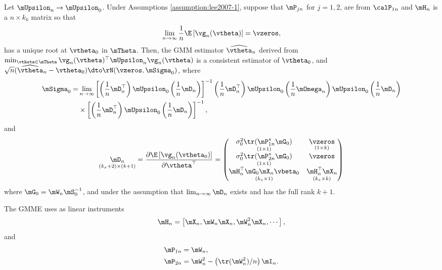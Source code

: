 \documentclass[english,12pt]{book}\usepackage[]{graphicx}\usepackage[]{xcolor}
\begin{document}
\begin{theorem}\label{teo:GMME-SLM}
Let $\mUpsilon_n\to \mUpsilon_0$. Under Assumptions \ref{assumption:lee2007-1}, suppose that $\mP_{jn}$ for $j = 1, 2$, are from $\calP_{1n}$ and $\mH_n$ is a $n\times k_k$ matrix so that
\begin{equation*}
\lim_{n \to \infty}\frac{1}{n}\E\left[\vg_n(\vtheta)\right] = \vzeros, 
\end{equation*}
%
has a unique root at $\vtheta_0$ in $\mTheta$. Then, the GMM estimator $\widehat{\vtheta}_n$ derived from $\min_{\vtheta \in \mTheta}\vg_n(\vtheta)^\top\mUpsilon_n\vg_n(\vtheta)$ is a consistent estimator of $\vtheta_0$, and $\sqrt{n}(\widehat{\vtheta}_n - \vtheta_0)\dto \rN(\vzeros, \mSigma_0)$, where
\begin{equation*}
\begin{aligned}
  \mSigma_0 = &  \lim_{n\to\infty}\left[\left(\frac{1}{n}\mD_n^\top\right)\mUpsilon_0\left(\frac{1}{n}\mD_n\right)\right]^{-1}\left(\frac{1}{n}\mD_n^\top\right)\mUpsilon_0\left(\frac{1}{n}\mOmega_n\right)\mUpsilon_0\left(\frac{1}{n}\mD_n\right) \\
  & \times \left[\left(\frac{1}{n}\mD_n^\top\right)\mUpsilon_0\left(\frac{1}{n}\mD_n\right)\right]^{-1},
  \end{aligned}
\end{equation*}
%
and
\begin{equation}\label{eq:D-gmm-slm}
\underset{(k_x + 2)\times (k + 1)}{\mD_n} = \frac{\partial \E\left[\vg_n(\vtheta_0)\right]}{\partial \vtheta^\top} = \begin{pmatrix}
           \underset{(1 \times 1)}{\sigma_0^2\tr(\mP^s_{1n}\mG_0)} & \underset{(1 \times k)}{\vzeros} \\
           \underset{(1 \times 1)}{\sigma_0^2\tr(\mP^s_{2n}\mG_0)} & \vzeros \\
           \underset{(k_x \times 1)}{\mH_n^\top\mG_0\mX_n\vbeta_0} & \underset{(k_x\times k)}{\mH^\top_n\mX_n}
         \end{pmatrix}
\end{equation}
%
where $\mG_0 = \mW_n\mS_0^{-1}$, and under the assumption that $\lim_{n\to\infty}\mD_n$ exists and has the full rank $k + 1$. 
\end{theorem}

The GMME uses as linear instruments
\begin{equation*}
\mH_n = \left[\mX_n, \mW_n\mX_n, \mW_n^2\mX_n, \cdots\right],
\end{equation*}
%
and
\begin{align*}
\mP_{1n} & = \mW_n, \\
\mP_{2n} & = \mW^2_n - \left(\tr(\mW^2_n)/n\right)\mI_n.
\end{align*}
\end{document}
